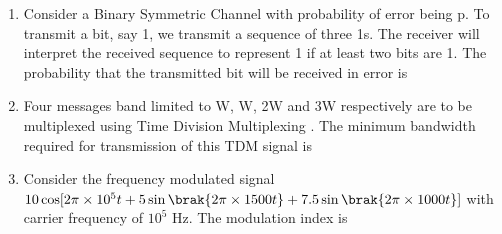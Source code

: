 \documentclass[a4paper, 11pt]{article}
\begin{document}
\begin{enumerate}
    \item Consider a Binary Symmetric Channel  with probability of error being p. To transmit a bit, say 1, we transmit a sequence of three 1s. The receiver will interpret the received sequence to represent 1 if at least two bits are 1. The probability that the transmitted bit will be received in error is
    \begin{enumerate}
    \end{enumerate}
    
    \hfill{}
    
    \item Four messages band limited to W, W, 2W and 3W respectively are to be multiplexed using Time Division Multiplexing . The minimum bandwidth required for transmission of this TDM signal is
    \begin{enumerate}
    \end{enumerate}
    
    \hfill{}
    
    \item Consider the frequency modulated signal $10\cos[2\pi \times 10^5 t + 5\sin\brak{2\pi \times 1500t} + 7.5\sin\brak{2\pi \times 1000t}]$ with carrier frequency of $10^5$ Hz. The modulation index is
    \begin{enumerate}
    \end{enumerate}
    

\end{enumerate}
\end{document}
